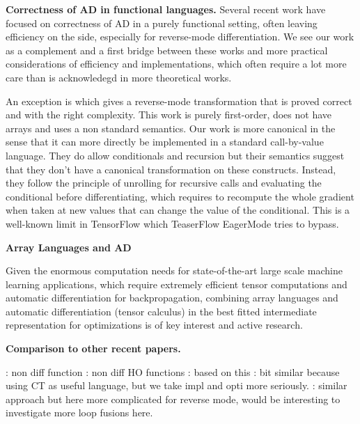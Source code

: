 \noindent \textbf{Correctness of AD in functional languages.}
Several recent work \cite{huot2020correctness,vakar2020reverse,vakar2020denotational,brunel2019backpropagation,barthe2020versatility,mazza2021automatic,ee2020correctness} have focused on correctness of AD in a purely functional setting, 
often leaving efficiency on the side, especially for reverse-mode differentiation. 
We see our work as a complement and a first bridge between these works 
and more practical considerations of efficiency and implementations, 
which often require a lot more care than is acknowledegd in more theoretical works.

An exception is \cite{abadi-plotkin2020} which gives a reverse-mode transformation that is proved correct and with the right complexity.
This work is purely first-order, does not have arrays and uses a non standard semantics. 
Our work is more canonical in the sense that it can more directly be implemented in a standard call-by-value language.
They do allow conditionals and recursion but their semantics suggest that they don't have a canonical transformation on these constructs. 
Instead, they follow the principle of unrolling for recursive calls and evaluating the conditional before differentiating, 
which requires to recompute the whole gradient when taken at new values that can change the value of the conditional. 
This is a well-known limit in TensorFlow \cite{abadi2016tensorflow} which TeaserFlow EagerMode \cite{agrawal2019tensorflow} tries to bypass. 

\noindent \textbf{Array Languages and AD}

Given the enormous computation needs for state-of-the-art large scale machine learning applications, 
which require extremely efficient tensor computations and automatic differentiation for backpropagation, 
combining array languages and automatic differentiation (tensor calculus) in the best 
fitted intermediate representation for optimizations is of key interest and active research.
\cite{bernstein2020differentiating} 
\cite{laue2018computing,laue2020simple}

\noindent \textbf{Comparison to other recent papers.}

\cite{ee2020correctness}: non diff function
\cite{sherman2021}: non diff HO functions
\cite{pearlmutter2008reverse}: based on this
\cite{elliott2018simple}: bit similar because using CT as useful language, but we take impl and opti more seriously.
\cite{shaikhha2019efficient}: similar approach but here more complicated for reverse mode, would be interesting to investigate more loop fusions here.

